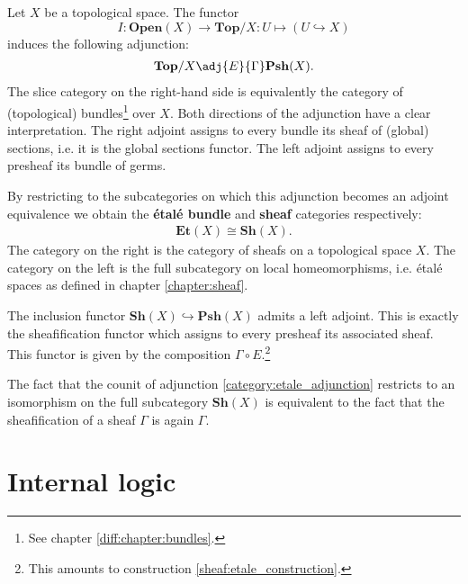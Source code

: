     \begin{construct}
        Let $X$ be a topological space. The functor \[I:\mathbf{Open}(X)\rightarrow\mathbf{Top}/X:U\mapsto(U\hookrightarrow X)\] induces the following adjunction:
        \begin{gather}
            \label{category:etale_adjunction}
            \mathbf{Top}/X\adj{E}{\Gamma}\mathbf{Psh}(X).
        \end{gather}
        The slice category on the right-hand side is equivalently the category of (topological) bundles\footnote{See chapter \ref{diff:chapter:bundles}.} over $X$. Both directions of the adjunction have a clear interpretation. The right adjoint assigns to every bundle its sheaf of (global) sections, i.e. it is the global sections functor. The left adjoint assigns to every presheaf its bundle of germs.

        By restricting to the subcategories on which this adjunction becomes an adjoint equivalence we obtain the \textbf{\'etal\'e bundle} and \textbf{sheaf} categories respectively:
        \begin{gather}
            \mathbf{Et}(X)\cong\mathbf{Sh}(X).
        \end{gather}
        The category on the right is the category of sheafs on a topological space $X$. The category on the left is the full subcategory on local homeomorphisms, i.e. \'etal\'e spaces as defined in chapter \ref{chapter:sheaf}.
    \end{construct}

    \begin{property}
        The inclusion functor $\mathbf{Sh}(X)\hookrightarrow\mathbf{Psh}(X)$ admits a left adjoint. This is exactly the sheafification functor which assigns to every presheaf its associated sheaf. This functor is given by the composition $\Gamma\circ E$.\footnote{This amounts to construction \ref{sheaf:etale_construction}.}

        The fact that the counit of adjunction \ref{category:etale_adjunction} restricts to an isomorphism on the full subcategory $\mathbf{Sh}(X)$ is equivalent to the fact that the sheafification of a sheaf $\Gamma$ is again $\Gamma$.
    \end{property}

\section{Internal logic}\label{cat:internal_logic}

